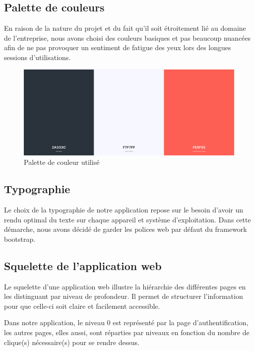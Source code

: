 \subsection{Palette de couleurs}
En raison de la nature du projet et du fait qu’il soit étroitement lié au
domaine de l'entreprise, nous avons choisi des couleurs basiques et pas beaucoup
nuancées afin de ne pas provoquer un sentiment de fatigue  des yeux lors des
longues sessions d'utilisations.

\begin{figure}[h!]
    \centering
    \includegraphics[scale=0.3 ]{images/palette_couleurs.PNG}
    \caption{Palette de couleur utilisé}
    \label{fig89}
\end{figure} 

\subsection{Typographie}
Le choix de la typographie de notre application repose sur le besoin d’avoir un 
rendu optimal du texte sur chaque appareil et système d'exploitation. Dans cette 
démarche, nous avons décidé de garder les polices web par défaut du framework 
bootstrap.

\subsection{Squelette de l'application web}
Le squelette d’une application web illustre la hiérarchie des différentes pages
en les distinguant par niveau de profondeur. Il permet de structurer
l’information pour que celle-ci soit claire et facilement accessible.

Dans notre application, le niveau 0 est représenté par la page 
d’authentification, les autres pages, elles aussi, sont réparties par niveaux 
en fonction du nombre de clique(s) nécessaire(s) pour se rendre dessus.

